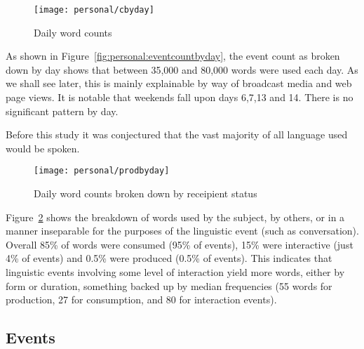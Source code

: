 % 


\begin{figure}[hp]
    \centering
    \texttt{[image: personal/cbyday]}
    \caption{Daily word counts}
    \label{fig:personal:wordcountbyday}
\end{figure}

As shown in Figure~\ref{fig:personal:eventcountbyday}, the event count as broken down by day shows that between 35,000 and 80,000 words were used each day.  As we shall see later, this is mainly explainable by way of broadcast media and web page views.  It is notable that weekends fall upon days 6,7,13 and 14.  There is no significant pattern by day.

Before this study it was conjectured that the vast majority of all language used would be spoken.


\begin{figure}[hp]
    \centering
    \texttt{[image: personal/prodbyday]}
    \caption{Daily word counts broken down by receipient status}
    \label{fig:personal:prodcountbyday}
\end{figure}

Figure~\ref{fig:personal:prodcountbyday} shows the breakdown of words used by the subject, by others, or in a manner inseparable for the purposes of the linguistic event (such as conversation).  Overall 85\% of words were consumed (95\% of events), 15\% were interactive (just 4\% of events) and 0.5\% were produced (0.5\% of events).  This indicates that linguistic events involving some level of interaction yield more words, either by form or duration, something backed up by median frequencies (55 words for production, 27 for consumption, and 80 for interaction events).










\subsection{Events}



